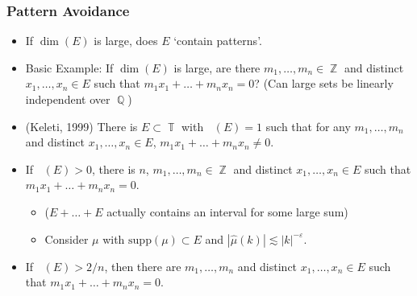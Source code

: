 \documentclass[handout,usenames,dvipsnames]{beamer}
\DeclareMathOperator{\QQ}{\mathbb{Q}}
\DeclareMathOperator{\ZZ}{\mathbb{Z}}
\DeclareMathOperator{\TT}{\mathbb{T}}
\DeclareMathOperator{\fordim}{\text{dim}_{\mathbb{F}}}
\DeclareMathOperator{\hausdim}{\text{dim}_{\mathbb{H}}}
\begin{document}
\begin{frame}
    \frametitle{Pattern Avoidance}

    \begin{itemize}
        \item If $\dim(E)$ is large, does $E$ `contain patterns'.

        \pause
        \item Basic Example: If $\dim(E)$ is large, are there $m_1,\dots,m_n \in \ZZ$ and distinct $x_1,\dots,x_n \in E$ such that $m_1x_1 + \dots + m_nx_n = 0$? (Can large sets be linearly independent over $\QQ$)

        \pause
        \item (Keleti, 1999) There is $E \subset \TT$ with $\hausdim(E) = 1$ such that for any $m_1,\dots,m_n$ and distinct $x_1,\dots,x_n \in E$, $m_1x_1 + \dots + m_nx_n \neq 0$.

        \pause
        \item If $\fordim(E) > 0$, there is $n$, $m_1,\dots,m_n \in \ZZ$ and distinct $x_1,\dots,x_n \in E$ such that $m_1x_1 + \dots + m_nx_n = 0$.

        \begin{itemize}
            \pause
            \item ($E + \dots + E$ actually contains an interval for some large sum)
            
            \pause
            \item Consider $\mu$ with $\text{supp}(\mu) \subset E$ and $|\widehat{\mu}(k)| \lesssim |k|^{-\varepsilon}$.
            
            
            
        \end{itemize}

        \pause
        \item If $\fordim(E) > 2/n$, then there are $m_1,\dots,m_n$ and distinct $x_1,\dots,x_n \in E$ such that $m_1x_1 + \dots + m_nx_n = 0$.
    \end{itemize}
\end{frame}
\end{document}
